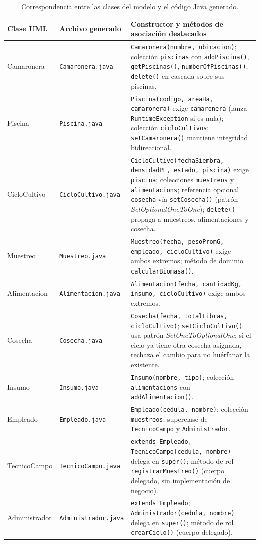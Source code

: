 \begin{table}[h]
  \centering
  \caption{Correspondencia entre las clases del modelo y el código Java generado.}
  \label{tab:correspondencia}
  \small
  \begin{tabular}{|l|l|p{6.3cm}|}
    \hline
    \textbf{Clase UML} & \textbf{Archivo generado} & \textbf{Constructor y métodos de asociación destacados} \\
    \hline
    Camaronera &
      \texttt{Camaronera.java} &
      \texttt{Camaronera(nombre, ubicacion)}; colección \texttt{piscinas} con \texttt{addPiscina()}, \texttt{getPiscinas()}, \texttt{numberOfPiscinas()}; \texttt{delete()} en cascada sobre sus piscinas. \\
    \hline
    Piscina &
      \texttt{Piscina.java} &
      \texttt{Piscina(codigo, areaHa, camaronera)} exige \texttt{camaronera} (lanza \texttt{RuntimeException} si es nula); colección \texttt{cicloCultivos}; \texttt{setCamaronera()} mantiene integridad bidireccional. \\
    \hline
    CicloCultivo &
      \texttt{CicloCultivo.java} &
      \texttt{CicloCultivo(fechaSiembra, densidadPL, estado, piscina)} exige \texttt{piscina}; colecciones \texttt{muestreos} y \texttt{alimentacions}; referencia opcional \texttt{cosecha} vía \texttt{setCosecha()} (patrón \emph{SetOptionalOneToOne}); \texttt{delete()} propaga a muestreos, alimentaciones y cosecha. \\
    \hline
    Muestreo &
      \texttt{Muestreo.java} &
      \texttt{Muestreo(fecha, pesoPromG, empleado, cicloCultivo)} exige ambos extremos; método de dominio \texttt{calcularBiomasa()}. \\
    \hline
    Alimentacion &
      \texttt{Alimentacion.java} &
      \texttt{Alimentacion(fecha, cantidadKg, insumo, cicloCultivo)} exige ambos extremos. \\
    \hline
    Cosecha &
      \texttt{Cosecha.java} &
      \texttt{Cosecha(fecha, totalLibras, cicloCultivo)}; \texttt{setCicloCultivo()} usa patrón \emph{SetOneToOptionalOne}: si el ciclo ya tiene otra cosecha asignada, rechaza el cambio para no huérfanar la existente. \\
    \hline
    Insumo &
      \texttt{Insumo.java} &
      \texttt{Insumo(nombre, tipo)}; colección \texttt{alimentacions} con \texttt{addAlimentacion()}. \\
    \hline
    Empleado &
      \texttt{Empleado.java} &
      \texttt{Empleado(cedula, nombre)}; colección \texttt{muestreos}; superclase de \texttt{TecnicoCampo} y \texttt{Administrador}. \\
    \hline
    TecnicoCampo &
      \texttt{TecnicoCampo.java} &
      \texttt{extends Empleado}; \texttt{TecnicoCampo(cedula, nombre)} delega en \texttt{super()}; método de rol \texttt{registrarMuestreo()} (cuerpo delegado, sin implementación de negocio). \\
    \hline
    Administrador &
      \texttt{Administrador.java} &
      \texttt{extends Empleado}; \texttt{Administrador(cedula, nombre)} delega en \texttt{super()}; método de rol \texttt{crearCiclo()} (cuerpo delegado). \\
    \hline
  \end{tabular}
\end{table}

